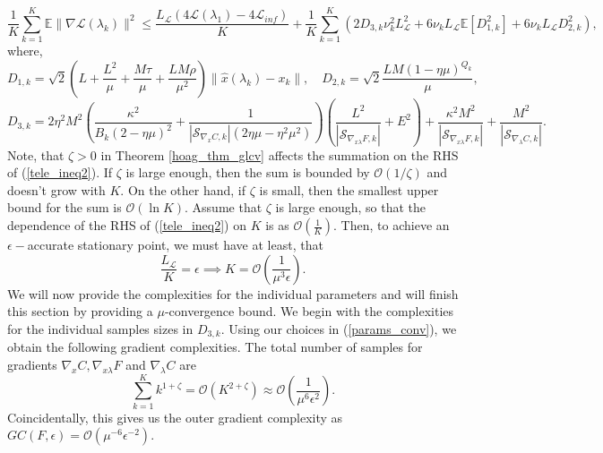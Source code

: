 \documentclass[11pt, twoside]{report}
\begin{document}
\begin{equation} \label{tele_ineq2}
    \frac{1}{K}\sum_{k=1}^K \mathbb{E}\|\nabla\mathcal{L}(\lambda_k)\|^2 \leq  \frac{L_\mathcal{L}\left(4\mathcal{L}(\lambda_1) - 4\mathcal{L}_{inf}\right)}{K} + \frac{1}{K}\sum_{k=1}^K \left(2D_{3,k}\nu_k^2 L^2_{\mathcal{L}} + 6\nu_kL_\mathcal{L}\mathbb{E}[D_{1,k}^2] + 6\nu_k L_\mathcal{L} D_{2,k}^2\right),
\end{equation}
where,
\[D_{1,k} = \sqrt{2}\left(L + \frac{L^2}{\mu} + \frac{M\tau}{\mu} + \frac{LM\rho}{\mu^2} \right) \|\hat{x}(\lambda_k) - x_k\|, \quad D_{2,k} = \sqrt{2} \frac{LM(1-\eta \mu)^{Q_k}}{\mu},\]
\begin{equation} \label{varbndthm2}
    D_{3,k} = 2\eta^2M^2\left(\frac{\kappa^2}{B_k (2 - \eta \mu)^2} + \frac{1}{|\mathcal{S}_{\nabla_{x} C,k}|(2\eta \mu - \eta^2 \mu^2)} \right)\left(\frac{L^2}{|\mathcal{S}_{\nabla_{x\lambda} F,k}|} + E^2\right)  +  \frac{\kappa^2M^2}{|\mathcal{S}_{\nabla_{x\lambda} F,k}|}+ \frac{M^2}{|\mathcal{S}_{\nabla_{\lambda} C,k}|}.
\end{equation}
Note, that $\zeta>0$ in Theorem \ref{hoag_thm_glcv} affects the summation on the RHS of (\ref{tele_ineq2}). If $\zeta$ is large enough, then the sum is bounded by $\mathcal{O}(1/\zeta)$ and doesn't grow with $K$. On the other hand, if $\zeta$ is small, then the smallest upper bound for the sum is $\mathcal{O}(\ln{K})$. Assume that $\zeta$ is large enough, so that the dependence of the RHS of (\ref{tele_ineq2}) on $K$ is as $\mathcal{O}\left( \frac{1}{K} \right)$. Then, to achieve an $\epsilon-$accurate stationary point, we must have at least, that
\[\frac{L_\mathcal{L}}{K} = \epsilon \implies K = \mathcal{O}\left(\frac{1}{\mu^3 \epsilon} \right).\]
We will now provide the complexities for the individual parameters and will finish this section by providing a $\mu$-convergence bound. We begin with the complexities for the individual samples sizes in $D_{3,k}$. Using our choices in (\ref{params_conv}), we obtain the following gradient complexities. The total number of samples for gradients $\nabla_{x}C, \nabla_{x\lambda} F$ and $\nabla_\lambda C$ are
\[\sum_{k=1}^K k^{1+\zeta} = \mathcal{O} \left(K^{2+\zeta} \right) \approx \mathcal{O}\left(\frac{1}{\mu^6\epsilon^2}\right).\]
Coincidentally, this gives us the outer gradient complexity as $GC(F,\epsilon) = \mathcal{O}(\mu^{-6}\epsilon^{-2})$.
\end{document}
